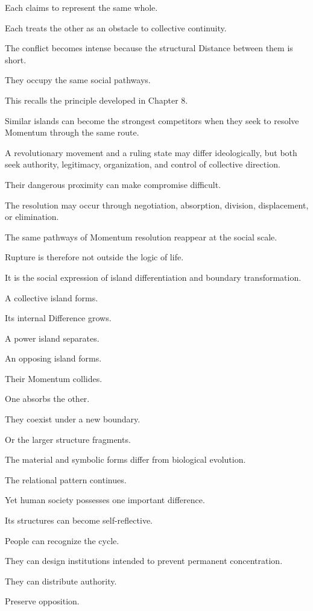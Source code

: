 Each claims to represent the same whole.

Each treats the other as an obstacle to collective continuity.

The conflict becomes intense because the structural Distance between them is short.

They occupy the same social pathways.

This recalls the principle developed in Chapter 8.

Similar islands can become the strongest competitors when they seek to resolve Momentum through the same route.

A revolutionary movement and a ruling state may differ ideologically, but both seek authority, legitimacy, organization, and control of collective direction.

Their dangerous proximity can make compromise difficult.

The resolution may occur through negotiation, absorption, division, displacement, or elimination.

The same pathways of Momentum resolution reappear at the social scale.

Rupture is therefore not outside the logic of life.

It is the social expression of island differentiation and boundary transformation.

A collective island forms.

Its internal Difference grows.

A power island separates.

An opposing island forms.

Their Momentum collides.

One absorbs the other.

They coexist under a new boundary.

Or the larger structure fragments.

The material and symbolic forms differ from biological evolution.

The relational pattern continues.

Yet human society possesses one important difference.

Its structures can become self-reflective.

People can recognize the cycle.

They can design institutions intended to prevent permanent concentration.

They can distribute authority.

Preserve opposition.

